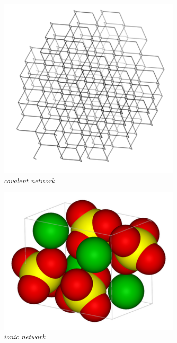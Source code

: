 \begin{figure}[H]
  \begin{center}
  \begin{minipage}[c]{4.5 cm}
    \includegraphics[width=0.8\textwidth]{photos/Diamond_Carbon.png} \\
    \textsl{covalent network}
  \end{minipage}
  \begin{minipage}[c]{4.5 cm}
    \includegraphics[width=0.8\textwidth]{photos/BaSO4_wikipedia.png}  \\ 
    \textsl{ionic network}
  \end{minipage}
  \begin{minipage}[c]{4.5 cm}

\end{minipage}
\end{center}
\end{figure}
